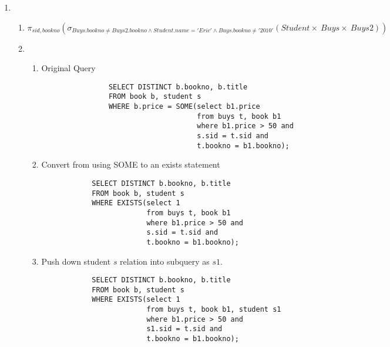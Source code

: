 \documentclass{article}
\begin{document}
\begin{enumerate}
    \item %
        \begin{enumerate}

        \item %
        \begin{displaymath}
            \pi_{sid, bookno}
                (\sigma_{Buys.bookno \ne Buys2.bookno \wedge Student.name='Eric' \wedge Buys.bookno \ne '2010'}
                    (Student \times\ Buys \times\ Buys2))
        \end{displaymath}

        \item %
        \begin{enumerate}

            \item Original Query
            \begin{lstlisting}
                SELECT DISTINCT b.bookno, b.title
                FROM book b, student s
                WHERE b.price = SOME(select b1.price
                                     from buys t, book b1
                                     where b1.price > 50 and
                                     s.sid = t.sid and
                                     t.bookno = b1.bookno);
            \end{lstlisting}

            \item Convert from using SOME to an exists statement
            \begin{lstlisting}
            SELECT DISTINCT b.bookno, b.title
            FROM book b, student s
            WHERE EXISTS(select 1
                         from buys t, book b1
                         where b1.price > 50 and
                         s.sid = t.sid and
                         t.bookno = b1.bookno);
            \end{lstlisting}

            \item Push down student $s$ relation into subquery as $s1$.
            \begin{lstlisting}
            SELECT DISTINCT b.bookno, b.title
            FROM book b, student s
            WHERE EXISTS(select 1
                         from buys t, book b1, student s1
                         where b1.price > 50 and
                         s1.sid = t.sid and
                         t.bookno = b1.bookno);
            \end{lstlisting}


\end{enumerate}
\end{enumerate}
\end{enumerate}
\end{document}
